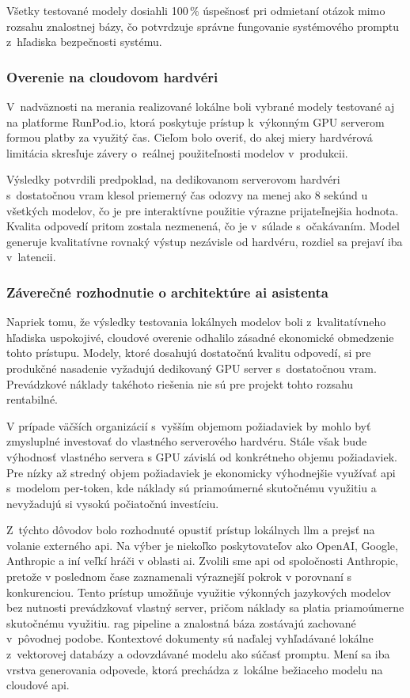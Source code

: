 Všetky testované modely dosiahli 100\,\% úspešnosť pri odmietaní otázok mimo
rozsahu znalostnej bázy, čo potvrdzuje správne fungovanie systémového promptu
z~hľadiska bezpečnosti systému.

\subsubsection{Overenie na cloudovom hardvéri}

V~nadväznosti na merania realizované lokálne boli vybrané modely testované aj
na platforme RunPod.io, ktorá poskytuje prístup k~výkonným GPU serverom formou
platby za využitý čas. Cieľom bolo overiť, do akej miery hardvérová limitácia
skresľuje závery o~reálnej použiteľnosti modelov v~produkcii.

Výsledky potvrdili predpoklad, na dedikovanom serverovom hardvéri s~dostatočnou
\acrshort{vram} klesol priemerný čas odozvy na menej ako 8 sekúnd u všetkých
modelov, čo je pre interaktívne použitie výrazne prijateľnejšia hodnota.
Kvalita odpovedí pritom zostala nezmenená, čo je v~súlade s~očakávaním. Model
generuje kvalitatívne rovnaký výstup nezávisle od hardvéru, rozdiel sa prejaví
iba v~latencii.

\subsubsection{Záverečné rozhodnutie o architektúre \acrshort{ai} asistenta}

Napriek tomu, že výsledky testovania lokálnych modelov boli z~kvalitatívneho
hľadiska uspokojivé, cloudové overenie odhalilo zásadné ekonomické obmedzenie
tohto prístupu. Modely, ktoré dosahujú dostatočnú kvalitu odpovedí, si pre
produkčné nasadenie vyžadujú dedikovaný GPU server s~dostatočnou
\acrshort{vram}. Prevádzkové náklady takéhoto riešenia nie sú pre projekt tohto
rozsahu rentabilné.

V prípade väčších organizácií s~vyšším objemom požiadaviek by mohlo byť
zmysluplné investovať do vlastného serverového hardvéru. Stále však bude
výhodnosť vlastného servera s GPU závislá od konkrétneho objemu požiadaviek.
Pre nízky až stredný objem požiadaviek je ekonomicky výhodnejšie
využívať \acrshort{api} s~modelom per-token, kde náklady sú priamoúmerné
skutočnému využitiu a nevyžadujú si vysokú počiatočnú investíciu.

Z~týchto dôvodov bolo rozhodnuté opustiť prístup lokálnych \acrshort{llm} a
prejsť na volanie externého \acrshort{api}. Na výber je niekoľko poskytovateľov
ako OpenAI, Google, Anthropic a iní veľkí hráči v oblasti \acrshort{ai}. Zvolili sme
\acrshort{api} od spoločnosti Anthropic, pretože v poslednom čase zaznamenali
výraznejší pokrok v porovnaní s konkurenciou. Tento prístup umožňuje využitie
výkonných jazykových modelov bez nutnosti prevádzkovať vlastný server, pričom
náklady sa platia priamoúmerne skutočnému využitiu. \acrshort{rag} pipeline a
znalostná báza zostávajú zachované v~pôvodnej podobe. Kontextové dokumenty sú
naďalej vyhľadávané lokálne z~vektorovej databázy a odovzdávané modelu ako
súčasť promptu. Mení sa iba vrstva generovania odpovede, ktorá prechádza
z~lokálne bežiaceho modelu na cloudové \acrshort{api}.

